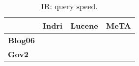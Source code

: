 \begin{table}[t]
\centering
{\small
\begin{tabular}{|l|r|r|r|}
    \hline & \textbf{Indri} & \textbf{Lucene} & \textbf{MeTA} \\
    \hline
    \textbf{Blog06} & & & \\
    \textbf{Gov2} & & & \\
    \hline
\end{tabular}
\caption{IR: query speed.}
}
\label{table:ir-query-speed}
\end{table}
